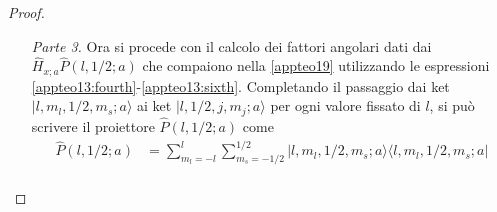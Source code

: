 \documentclass[12pt,a4paper]{report}
\numberwithin{equation}{section}
\numberwithin{section}{chapter}
\begin{document}
\begin{proof}
\begin{enumerate}[leftmargin=0pt, itemindent=2.67\parindent]
\begin{align}
		\end{align}
		Gli operatori $\widehat{H}_{x;a}$ sono funzioni di $\widehat{\boldsymbol{l}}$ e $\widehat{\boldsymbol{s}}$, quindi lo spazio $\mathcal{E}(l,1/2;a)$, generato dai ket $|l,m_l,1/2,m_s;a\rangle$, per valori fissati di $l$ e $s$, \`e invariante sotto l'azione dei $\widehat{H}_{x;a}$. Inoltre gli spazi $\mathcal{E}(l,1/2;a)$ e $\mathcal{E}(l',1/2;a)$ sono ortogonali con $l\neq l'$ (coincidono altrimenti), per cui
		\begin{equation}
		\label{appteo17}
		\widehat{P}(l',1/2;a)\widehat{P}(l,1/2;a) = \delta_{l',l}\widehat{P}(l,1/2;a)~.
		\end{equation}
		Ne segue
		\begin{align}
		\label{appteo18}
		&\widehat{P}(l',1/2;a)\widehat{H}_{x;a}\widehat{P}(l,1/2;a)
		\\
		&\hspace{3cm}=\widehat{H}_{x;a}\widehat{P}(l',1/2;a)\widehat{P}(l,1/2;a) = \delta_{l',l}\widehat{H}_{x;a}\widehat{P}(l,1/2;a)~.\nonumber
		\end{align}
		Utilizzando, ora, \eqref{appteo16} e \eqref{appteo18} \`e possibile semplificare ulteriormente l'espressione per $\widehat{P}_u(n)\widehat{H}_x\widehat{P}_u(n)$
		\begin{align}
		\label{appteo19}
		&\widehat{P}_u(n)\widehat{H}_x\widehat{P}_u(n)\\
		&\hspace{1.5cm}=\sum\nolimits_{l,l'= 0}^{n-1}|n,l';r\rangle\langle n,l';r|\widehat{H}_{x;r}|n,l;r\rangle\langle n,l;r|\delta_{l',l}\widehat{H}_{x;a}\widehat{P}(l,1/2;a)\nonumber\\
		&\hspace{1.5cm}=\sum\nolimits_{l=0}^{n-1}|n,l;r\rangle\langle n,l;r|\widehat{H}_{x;r}|n,l;r\rangle\langle n,l;r|\widehat{H}_{x;a}\widehat{P}(l,1/2;a)~.\nonumber
		\end{align}
		\item[\textit{Parte 3.}] Ora si procede con il calcolo dei fattori angolari dati dai $\widehat{H}_{x;a}\widehat{P}(l,1/2;a)$ che compaiono nella \eqref{appteo19} utilizzando le espressioni \eqref{appteo13:fourth}-\eqref{appteo13:sixth}. Completando il passaggio dai ket $|l,m_l,1/2,m_s;a\rangle$ ai ket $|l,1/2,j,m_j;a\rangle$ per ogni valore fissato di $l$, si pu\`o scrivere il proiettore $\widehat{P}(l,1/2;a)$ come
		\begin{align}
		\label{appteo20}
		\widehat{P}(l,1/2;a) &=\sum\nolimits_{m_l=-l}^l\sum\nolimits_{m_s=-1/2}^{1/2}|l,m_l,1/2,m_s;a\rangle\langle l,m_l,1/2,m_s;a|\\

\end{align}
\end{enumerate}
\end{proof}
\end{document}
